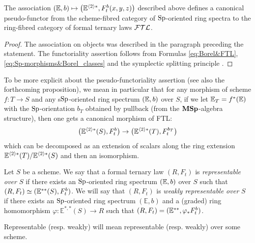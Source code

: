 \begin{prop}
The association $(\mathbb E,b) \mapsto \big(\mathbb E^{\langle 2 \rangle*},F_t^b(x,y,z)\big)$ described above
 defines a canonical pseudo-functor from the scheme-fibred category of $\mathrm{Sp}$-oriented ring spectra
 to the ring-fibred category of formal ternary laws $\mathcal{FTL}$.
\end{prop}
\begin{proof}
The association on objects was described in the paragraph preceding the statement.
 The functoriality assertion follows from Formulas \eqref{eq:Borel&FTL},
 \eqref{eq:Sp-morphisms&Borel_classes}
 and the symplectic splitting principle \cite[Par. 2.2.5]{DF3}.
\end{proof}

\begin{rem}\label{rem:repFTL&BC}
To be more explicit about the pseudo-functoriality assertion (see also the forthcoming proposition),
 we mean in particular that for any morphism
 of scheme $f:T \rightarrow S$ and any s$\mathrm{Sp}$-oriented ring spectrum $(\mathbb E,b)$ over $S$,
 if we let $\mathbb E_T=f^*(\mathbb E)$ with the $\mathrm{Sp}$-orientation $b_T$ obtained by pullback
 (from the $\mathbf{MSp}$-algebra structure), then one gets a canonical morphism of FTL:
$$
\big(\mathbb E^{\langle 2 \rangle*}(S),F_t^b\big) \rightarrow \big(\mathbb E^{\langle 2 \rangle*}(T),F_t^{b_T}\big)
$$
which can be decomposed as an extension of scalars along
 the ring extension $\mathbb E^{\langle 2 \rangle*}(T)/\mathbb E^{\langle 2 \rangle*}(S)$ and then an isomorphism.
\end{rem}

\begin{df}
Let $S$ be a scheme. We say that a formal ternary law $(R,F_t)$ is \emph{representable over $S$}
 if there exists an $\mathrm{Sp}$-oriented ring spectrum $(\mathbb E,b)$ over $S$ such that $(R,F_t) \simeq (\mathbb E^{**}(S),F_t^b)$.  
 We will say that $(R,F_t)$ is \emph{weakly representable over $S$} if there exists an $\mathrm{Sp}$-oriented ring spectrum $(\mathbb{E},b)$
 and a (graded) ring homomorphism $\varphi: \mathbb{E}^{*,*}(S)\to R$ such that $(R,F_t)=(\mathbb E^{**},\varphi_*F_t^b)$.

Representable (resp. weakly) will mean representable (resp. weakly) over some scheme.
\end{df}

